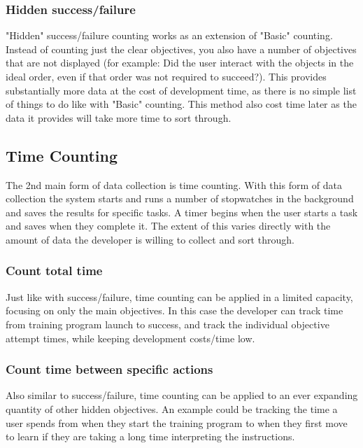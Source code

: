 \documentclass{article}
\begin{document}
\subsubsection{Hidden success/failure}
 "Hidden" success/failure counting works as an extension of "Basic" counting.  Instead of counting just the clear objectives, you also have a number of objectives that are not displayed (for example: Did the user interact with the objects in the ideal order, even if that order was not required to succeed?). This provides substantially more data at the cost of development time, as there is no simple list of things to do like with "Basic" counting. This method also cost time later as the data it provides will take more time to sort through. 

\subsection{Time Counting}
The 2nd main form of data collection is time counting. With this form of data collection the system starts and runs a number of stopwatches in the background and saves the results for specific tasks. A timer begins when the user starts a task and saves when they complete it. The extent of this varies directly with the amount of data the developer is willing to collect and sort through. 


\subsubsection{Count total time}
Just like with success/failure, time counting can be applied in a limited capacity, focusing on only the main objectives. In this case the developer can track time from training program launch to success, and track the individual objective attempt times, while keeping development costs/time low. 


\subsubsection{Count time between specific actions}
Also similar to success/failure, time counting can be applied to an ever expanding quantity of other hidden objectives. An example could be tracking the time a user spends from when they start the training program to when they first move to learn if they are taking a long time interpreting the instructions.
\end{document}
